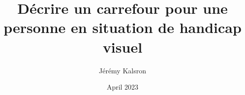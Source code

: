 \documentclass{article}
\title{Décrire un carrefour pour une personne en situation de handicap visuel}
\author{Jérémy Kalsron}
\date{April 2023}
\begin{document}
\maketitle

\newcommand{\todo}[1]{{\color{red}\textbf{TODO} #1}}

\newcommand{\pcdv}[1]{personne concernée par la déficience visuelle}
\newcommand{\pcdvs}[1]{personnes concernées par la déficience visuelle}







\end{document}
